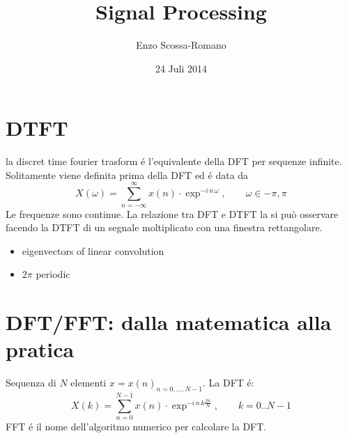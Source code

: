 \documentclass[11pt,a4paper,DIV12,BCOR1.5mm]{scrartcl}
\author{Enzo Scossa-Romano}
\date{24 Juli 2014}
\title{Signal Processing}
\begin{document}
\maketitle
\tableofcontents
\section{DTFT}
la discret time fourier trasform é l'equivalente della DFT per sequenze infinite. Solitamente viene definita prima della DFT ed é data da 
\begin{equation}
X(\omega) = \sum_{n=-\infty}^{\infty} x(n)\cdot \exp^{-i\,n\,\omega},\qquad \omega \in -\pi,\pi
\end{equation} 
Le frequenze sono continue. La relazione tra DFT e DTFT la si può osservare facendo la DTFT di un segnale moltiplicato con una finestra rettangolare. 
\begin{itemize}
	\item eigenvectors of linear convolution
	\item $2\pi$ periodic
\end{itemize}

\section{DFT/FFT: dalla matematica alla pratica}
Sequenza di $N$ elementi $x= {x(n)}_{n=0,...,N-1}$. La DFT é:
\begin{equation}
	X(k) = \sum_{n=0}^{N-1} x(n)\cdot \exp^{-i\,n\,k \frac{2\pi}{N}},\qquad k = 0..N-1
\end{equation}
FFT é il nome dell'algoritmo numerico per calcolare la DFT.\\
\end{document}
